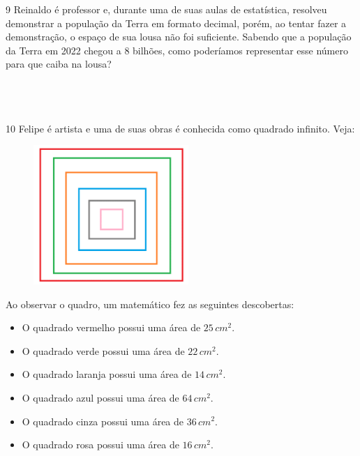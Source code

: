 \num{9} Reinaldo é professor e, durante uma de suas aulas de estatística,
resolveu demonstrar a população da Terra em formato decimal, porém, ao
tentar fazer a demonstração, o espaço de sua lousa não foi suficiente.
Sabendo que a população da Terra em 2022 chegou a 8 bilhões, como
poderíamos representar esse número para que caiba na lousa?

\\
\\
\\

\num{10} Felipe é artista e uma de suas obras é conhecida como quadrado
infinito. Veja:

\begin{figure}[H]
\centering\includegraphics[width=2.3125in,height=2.07917in]{./imgSAEB_8_MAT/media/image2.png}
\end{figure}

Ao observar o quadro, um matemático fez as seguintes
descobertas:

\begin{itemize}
\item O quadrado vermelho possui uma área de $25\,cm^2$.

\item O quadrado verde possui uma área de $22\,cm^2$.

\item O quadrado laranja possui uma área de $14\,cm^2$.

\item O quadrado azul possui uma área de $64\,cm^2$.

\item O quadrado cinza possui uma área de $36\,cm^2$.

\item O quadrado rosa possui uma área de $16\,cm^2$.
\end{itemize}

